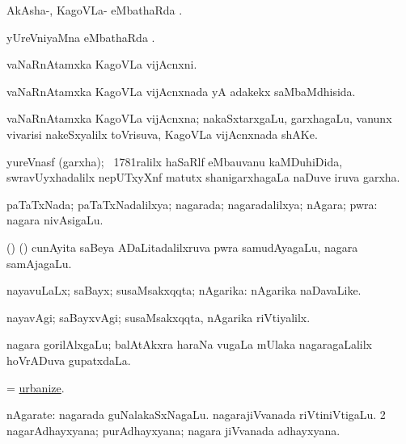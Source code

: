 \bentry
{} 
\gl{\sapUpa}
\expl{}
\bmng
AkAsha-, KagoVLa- eMbathaRda \sapUpa. 
\emng
\eentry

\bentry
{} 
\gl{\sapUpa}
\expl{}
\bmng
yUreVniyaMna eMbathaRda \sapUpa. 
\emng
\eentry

\bentry
{} 
\gl{\nA}
\expl{}
\bmng
vaNaRnAtamxka KagoVLa vijAcnxni. 
\emng
\eentry

\bentry
{} 
\gl{\gu}
\expl{}
\bmng
vaNaRnAtamxka KagoVLa vijAcnxnada yA adakekx saMbaMdhisida. 
\emng
\eentry

\bentry
{} 
\gl{\nA}
\expl{}
\bmng
vaNaRnAtamxka KagoVLa vijAcnxna; nakaSxtarxgaLu, garxhagaLu, \mo vanunx vivarisi nakeSxyalilx toVrisuva, KagoVLa vijAcnxnada shAKe. 
\emng
\eentry

\bentry
{} 
\gl{\nA}
\expl{}
\bmng
yureVnasf (garxha); \kirxsha\ 1781ralilx haSaRlf eMbauvanu kaMDuhiDida, swravUyxhadalilx nepUTxyXnf matutx shanigarxhagaLa naDuve iruva garxha. 
\emng
\eentry

\bentry
{} 
\gl{\gu}
\expl{}
\bmng
paTaTxNada; paTaTxNadalilxya; nagarada; nagaradalilxya; nAgara; pwra:  nagara nivAsigaLu. 
\emng
\eentry

\bentry
{}
\gl{\nA}
\expl{}
\bmng
(\birx) (\ca) cunAyita saBeya ADaLitadalilxruva pwra samudAyagaLu, nagara samAjagaLu. 
\emng
\eentry

\bentry
{} 
\gl{\gu}
\bmng
nayavuLaLx; saBayx; susaMsakxqqta; nAgarika:  nAgarika naDavaLike. 
\emng
\eentry

\bentry
{} 
\gl{\kirxvi}
\expl{}
\bmng
nayavAgi; saBayxvAgi; susaMsakxqqta, nAgarika riVtiyalilx. 
\emng
\eentry

\bentry
{}
\gl{\nA}
\expl{}
\bmng
nagara gorilAlxgaLu; balAtAkxra haraNa \mo vugaLa mUlaka nagaragaLalilx hoVrADuva gupatxdaLa. 
\emng
\eentry

\bentry
{} 
\gl{\sakirx}
\expl{}
\bmng
= \hyperlink{urbanize}{urbanize}. 
\emng
\eentry

\bentry
{} 
\gl{\nA}
\expl{}
\bmng
\bnum
{} nAgarate: 
\banum
{} nagarada guNalakaSxNagaLu. 
 nagarajiVvanada riVtiniVtigaLu. 
\eanum
\numie
\num{2} nagarAdhayxyana; purAdhayxyana; nagara jiVvanada adhayxyana. 
\enum
\emng
\eentry

